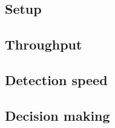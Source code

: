 \label {fs-short-experiments}

\subsection{Setup}

\subsection{Throughput}

\subsection{Detection speed}

\subsection{Decision making}
